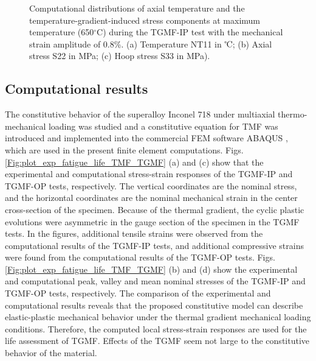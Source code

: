 \documentclass[preprint,5p,twocolumn,10pt,sort&compress]{elsarticle}
\begin{document}
\begin{figure}
  \caption{Computational distributions of axial temperature and the temperature-gradient-induced stress components at maximum temperature (650$^{\circ}$C) during the TGMF-IP test with the mechanical strain amplitude of 0.8\%.  (a) Temperature NT11 in ℃; (b) Axial stress S22 in MPa; (c) Hoop stress S33 in MPa).}
  \label{Fig:FEM_result}
\end{figure}

\subsection{Computational results}

The constitutive behavior of the superalloy Inconel 718 under multiaxial thermo-mechanical loading was studied and a constitutive equation for TMF was introduced and implemented into the commercial FEM software  ABAQUS \cite{SUN2019228, SUN201989}, which are used in the present finite element computations. Figs. \ref{Fig:plot_exp_fatigue_life_TMF_TGMF} (a) and (c) show that the experimental and computational stress-strain responses of the TGMF-IP and TGMF-OP tests, respectively. The vertical coordinates are the nominal stress, and the horizontal coordinates are the nominal mechanical strain in the center cross-section of the specimen. Because of the thermal gradient, the cyclic plastic evolutions were asymmetric in the gauge section of the specimen in the TGMF tests. In the figures, additional tensile strains were observed from the computational results of the TGMF-IP tests, and additional compressive strains were found from the computational results of the TGMF-OP tests. Figs. \ref{Fig:plot_exp_fatigue_life_TMF_TGMF} (b) and (d) show the experimental and computational peak, valley and mean nominal stresses of the TGMF-IP and TGMF-OP tests, respectively. The comparison of the experimental and computational results reveals that the proposed constitutive model can describe elastic-plastic mechanical behavior under the thermal gradient mechanical loading conditions. Therefore, the computed local stress-strain responses are used for the life assessment of TGMF. Effects of the TGMF seem not large to the constitutive behavior of the material.
\end{document}
